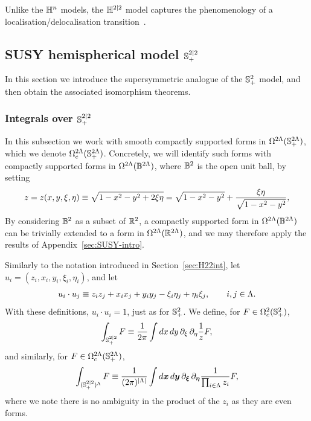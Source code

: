 \documentclass[11pt,a4paper]{article}
\begin{document}
\begin{remark}
\label{rem:H22-phenom}
  Unlike the $\mathbb{H}^{n}$ models, the $\mathbb{H}^{2|2}$ model captures the
  phenomenology of a localisation/delocalisation
  transition~\cite{MR2728731,MR2953867}.
\end{remark}

\subsection{SUSY hemispherical model ${\mathbb S}^{2|2}_{+}$}
\label{sec:susy-hemisph-model}

In this section we introduce the supersymmetric analogue of
the ${\mathbb S}^{2}_{+}$ model, and then obtain the associated isomorphism
theorems.

\subsubsection{Integrals over ${\mathbb S}_{+}^{2|2}$}
\label{sec:S22int}

In this subsection we work with smooth compactly supported forms in
$\Omega^{2\Lambda}({\mathbb S}_+^{2\Lambda})$, which we denote
$\Omega^{2\Lambda}_{c}({\mathbb S}_+^{2\Lambda})$.  Concretely, we will
identify such forms with compactly supported forms in
$\Omega^{2\Lambda}({\mathbb B}^{2\Lambda})$, where ${\mathbb B}^2$ is the open unit
ball, by setting 
\begin{equation}
  \label{eq:zformS}
  z = z(x,y,\xi,\eta) \equiv \sqrt{1-x^{2}-y^{2} + 2\xi\eta} 
  = \sqrt{1-x^{2}-y^{2}}
  + \frac{\xi\eta}{\sqrt{1-x^{2}-y^{2}}},
\end{equation}
By considering ${\mathbb B}^2$ as a subset of $\mathbb{R}^{2}$, a compactly supported
form in $\Omega^{2\Lambda}({\mathbb B}^{2\Lambda})$ can be trivially extended
to a form in $\Omega^{2\Lambda}(\mathbb{R}^{2\Lambda})$, and we may therefore
apply the results of Appendix~\ref{sec:SUSY-intro}.

Similarly to the notation introduced in Section~\ref{sec:H22int},
let $u_{i}=(z_{i},x_{i},y_{i},\xi_{i},\eta_{i})$, and let
\begin{equation}
  \label{eq:hemprod}
  u_{i}\cdot u_{j} \equiv z_{i}z_{j} +  x_{i}x_{j} + y_{i}y_{j}  -
  \xi_{i}\eta_{j} + \eta_{i}\xi_{j}, \qquad i,j\in\Lambda.
\end{equation}
With these definitions, $u_{i}\cdot u_{i} = 1$, just as for
${\mathbb S}^{2}_{+}$. We define, for $F\in \Omega^{2}_c({\mathbb S}^{2}_+)$,
\begin{equation}
  \label{eq:S22int}
  \int_{{\mathbb S}^{2|2}_{+}}F \equiv 
  \frac{1}{2\pi} \int dx\,dy\, \partial_{\xi}\, \partial_{\eta}  \frac{1}{z} F,
\end{equation}
and similarly, for $F\in\Omega^{2\Lambda}_{c}({\mathbb S}^{2\Lambda}_{+})$,
\begin{equation}
  \label{eq:S22-int-L}
  \int_{({\mathbb S}^{2|2}_{+})^{\Lambda}}F \equiv 
  \frac{1}{(2\pi)^{|\Lambda|}} \int d\boldsymbol{x}\,d\boldsymbol{y}\, \partial_{\boldsymbol{\xi}}\, \partial_{\boldsymbol{\eta}}\frac{1}{\prod_{i\in\Lambda} z_{i}} F,
\end{equation}
where we note there is no ambiguity in the product of the $z_{i}$ as
they are even forms.
\end{document}
